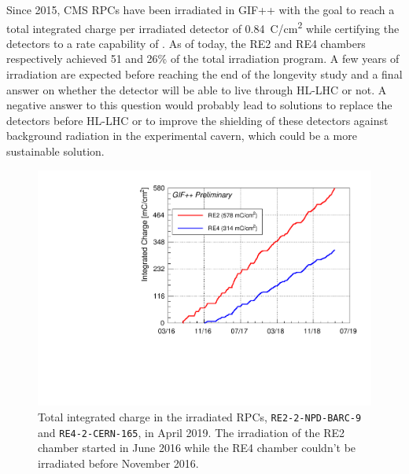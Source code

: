    Since 2015, CMS RPCs have been irradiated in GIF++ with the goal to reach a total integrated charge per irradiated detector of \SI{0.84}{C/cm^2} while certifying the detectors to a rate capability of . As of today, the RE2 and RE4 chambers respectively achieved 51 and 26\% of the total irradiation program. A few years of irradiation are expected before reaching the end of the longevity study and a final answer on whether the detector will be able to live through HL-LHC or not. A negative answer to this question would probably lead to solutions to replace the detectors before HL-LHC or to improve the shielding of these detectors against background radiation in the experimental cavern, which could be a more sustainable solution.

	\begin{figure}[H]
        \centering
		\includegraphics[width = \plotwidth]{fig/chapt5/GIFpp-Qint.pdf}
		\caption{\label{fig:GIFppQint} Total integrated charge in the irradiated RPCs, \texttt{RE2-2-NPD-BARC-9} and \texttt{RE4-2-CERN-165}, in April 2019. The irradiation of the RE2 chamber started in June 2016 while the RE4 chamber couldn't be irradiated before November 2016.}
	\end{figure}
	

\clearpage{\pagestyle{empty}\cleardoublepage}
